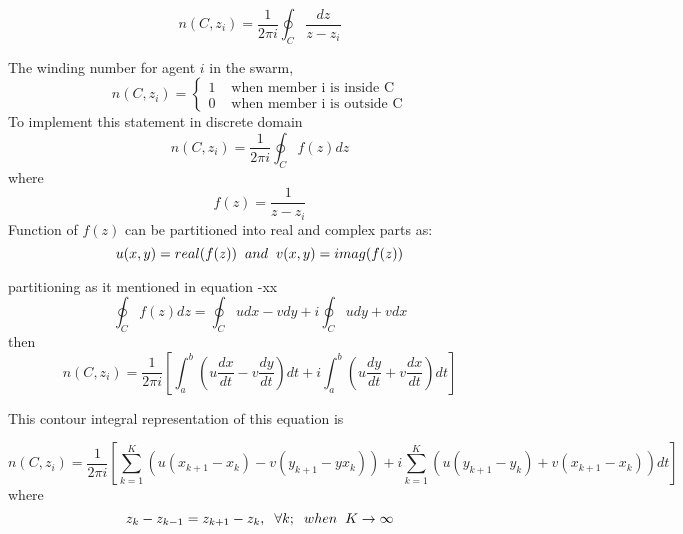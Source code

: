 \documentclass[twoside]{article}
\begin{document}
\begin{multicols}{2}
		\begin{equation}
 n(C,z_i) = \frac{1}{2\pi i}\oint_C \frac{dz}{z-z_i}
 		\end{equation}
		
		The winding number for agent $i$ in the swarm,
\begin{equation}
n(C,z_i) = \left\{ \begin{array}{rl}
1 &\mbox{ when member i is inside C} \\
0 &\mbox{ when member i is outside C}
\end{array} \right.
\end{equation}
		To implement this statement in discrete domain 
		\begin{equation}
n(C,z_i) = \frac{1}{2\pi i} \oint_C f(z)dz
		\end{equation}
		where 
		\begin{equation}
f(z) = \frac{1}{z-z_i}
		\end{equation}
		Function of $f(z)$ can be partitioned into real and complex parts as:
		\begin{equation}
u(x,y) = real(f(z))  \hspace{0.2cm} and \hspace{0.2cm} v(x,y) = imag(f(z))
		\end{equation}
		
		partitioning as it mentioned in equation -xx
		\begin{equation}
\oint_C f(z)dz  = \oint_C u dx - v dy + i \oint_C u dy + v dx 
		\end{equation}
		then
		\begin{equation}
n(C,z_i)  = \frac{1}{2\pi i} \left[\int_{a}^{b} \left(u\frac{dx}{dt} - v\frac{dy}{dt}\right)dt + i\int_{a}^{b}\left(u\frac{dy}{dt} + v\frac{dx}{dt}\right)dt\right]
		\end{equation}
		
		This contour integral representation of this equation is
		
		\begin{equation}
n(C,z_i)  = \frac{1}{2\pi i} \left[\sum_{k=1}^{K} \left(u(x_{k+1} - x_k ) - v(y_{k+1} -yx_k )\right) + i\sum_{k=1}^{K}\left(u(y_{k+1} - y_k ) + v(x_{k+1} - x_k )\right)dt\right]
		\end{equation}
		where
		\begin{equation}
z_k - z_{k-1} = z_{k+1} - z_k, \hspace{0.2cm}  \forall k ;  \hspace{0.2cm} when  \hspace{0.2cm} K \to\infty
		\end{equation}


\end{multicols}
\end{document}
